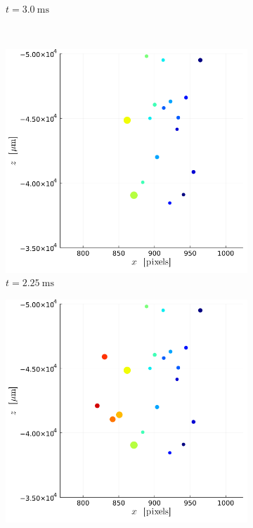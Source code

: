 \begin{figure}[H]
\begin{subfigure}[t]{0.32\linewidth}
        \caption*{$t = \SI{3.0}{\ms}$}
    \end{subfigure}
    \\
    \begin{subfigure}[t]{0.32\linewidth}
        \includegraphics[width=\linewidth]{./Figure/4_Results/exp/xz_detailed_view/out0010.png}
        \caption*{$t = \SI{2.25}{\ms}$}
    \end{subfigure}
    \begin{subfigure}[t]{0.32\linewidth}
        \includegraphics[width=\linewidth]{./Figure/4_Results/exp/xz_detailed_view/out0014.png}

\end{subfigure}
\end{figure}
